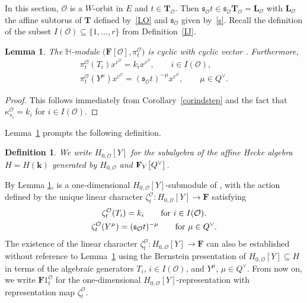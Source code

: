 \documentclass[pdftex]{sigma}
\numberwithin{equation}{section}
\newtheorem{Lemma}[Theorem]{Lemma}
\newtheorem{Definition}[Theorem]{Definition}
\begin{document}
In this section, $\mathcal{O}$ is a $W$-orbit in $E$ and $t\in\mathbf{T}_\mathcal{O}$. Then $\mathfrak{s}_\mathcal{O}t\in\mathfrak{s}_\mathcal{O}\mathbf{T}_{\mathcal{O}}=\mathbf{L}_\mathcal{O}$ with
$\mathbf{L}_\mathcal{O}$ the affine subtorus of $\mathbf{T}$ defined by~\eqref{LO} and $\mathfrak{s}_\mathcal{O}$ given by~\eqref{s}. Recall the definition of the subset $I(\mathcal{O})\subseteq\{1,\dots,r\}$ from Definition~\ref{IJ}.

\begin{Lemma}\label{cyclicaction}
The $\mathbb{H}$-module $\bigl(\mathbf{F}[\mathcal{O}],\pi_{t}^\mathcal{O}\bigr)$ is cyclic with
cyclic vector . Furthermore,
\begin{gather}
\pi_{t}^\mathcal{O}(T_i)x^{c^\mathcal{O}}=k_ix^{c^\mathcal{O}},\qquad i\in I(\mathcal{O}),\nonumber\\
\pi_{t}^\mathcal{O}(Y^\mu)x^{c^\mathcal{O}}=(\mathfrak{s}_\mathcal{O}t)^{-\mu}x^{c^\mathcal{O}},\qquad \mu\in Q^\vee.\label{genfor0}
\end{gather}
\end{Lemma}
\begin{proof}
This follows immediately from Corollary~\ref{corindstep} and the fact that $\kappa_{s_i}^\mathcal{O}=k_i$ for $i\in I(\mathcal{O})$.
\end{proof}

Lemma~\ref{cyclicaction} prompts the following definition.

\begin{Definition}%
We write $H_{0,\mathcal{O}}[Y]$ for the subalgebra of the
affine Hecke algebra $H=H(\mathbf{k})$ generated by $H_{0,\mathcal{O}}$ and $\mathbf{F}_Y\smash{\bigl[Q^\vee\bigr]}$.
\end{Definition}
By Lemma
\ref{cyclicaction},  is a one-dimensional $H_{0,\mathcal{O}}[Y]$-submodule of
, with the action defined by
the unique linear character $\zeta_{t}^\mathcal{O}\colon H_{0,\mathcal{O}}[Y]\rightarrow\mathbf{F}$ satisfying
\begin{gather}
\zeta_{t}^\mathcal{O}(T_i)=k_{i}\qquad \textup{for}\ i\in I(\mathcal{O}),\nonumber\\
\zeta_{t}^\mathcal{O}(Y^\mu)=(\mathfrak{s}_\mathcal{O}t)^{-\mu}\qquad\textup{for}\ \mu\in Q^\vee.\label{zzz}
\end{gather}
The existence of the linear character $\zeta_t^\mathcal{O}\colon H_{0,\mathcal{O}}[Y]\rightarrow\mathbf{F}$ can also be established without reference to Lemma~\ref{cyclicaction} using the Bernstein presentation of $H_{0,\mathcal{O}}[Y]\subseteq H$ in terms of the algebraic generators $T_i$, $i\in I(\mathcal{O})$, and $Y^\mu$, $\mu\in Q^\vee$. From now on, we write $\mathbf{F}1_{t}^\mathcal{O}$ for the one-dimensional $H_{0,\mathcal{O}}[Y]$-representation with representation map
$\zeta_t^\mathcal{O}$.
\end{document}

